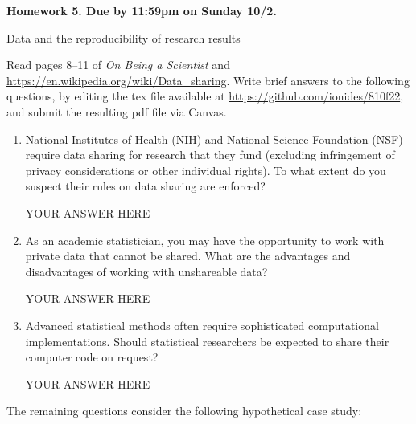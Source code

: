 \documentclass[12pt]{article}
\begin{document}
\begin{center}\bf
Homework 5. Due by 11:59pm on Sunday 10/2.

Data and the reproducibility of research results
\end{center}
Read pages 8--11 of {\em On Being a Scientist} and \url{https://en.wikipedia.org/wiki/Data_sharing}. Write brief answers to the following questions, by editing the tex file available at \url{https://github.com/ionides/810f22}, and submit the resulting pdf file via Canvas.

\begin{enumerate}

\item National Institutes of Health (NIH) and National Science Foundation (NSF) require data sharing for research that they fund (excluding infringement of privacy considerations or other individual rights). To what extent do you suspect their rules on data sharing are enforced?

YOUR ANSWER HERE

\item As an academic statistician, you may have the opportunity to work with private data that cannot be shared. What are the advantages and disadvantages of working with unshareable data?
  
YOUR ANSWER HERE
  

\item Advanced statistical methods often require sophisticated computational implementations. Should statistical researchers be expected to share their computer code on request?

YOUR ANSWER HERE

\end{enumerate}
The remaining questions consider the following hypothetical case study:
\end{document}
